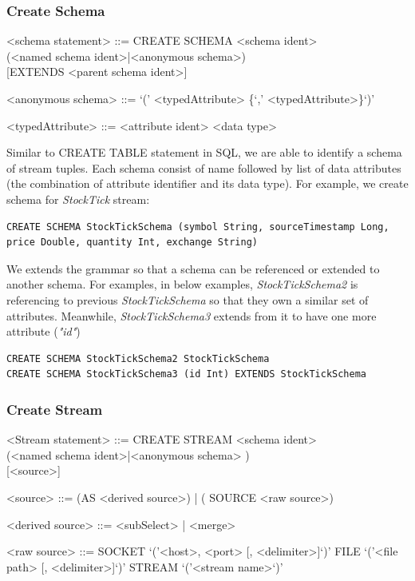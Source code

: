 \subsubsection{Create Schema}

\setlength{\grammarindent}{12em} %

\begin{grammar}

<schema statement> ::= CREATE SCHEMA <schema ident> \\
(<named schema ident>|<anonymous schema>) \\
  { }[EXTENDS <parent schema ident>]

<anonymous schema> ::= `(' <typedAttribute> \{`,' <typedAttribute>\}`)'

<typedAttribute> ::= <attribute ident> <data type>

\end{grammar}
	
Similar to CREATE TABLE statement in SQL, we are able to identify a schema of stream tuples. Each schema consist of name followed by list of data attributes (the combination of attribute identifier and its data type). For example, we create schema for \textit{StockTick} stream:
\begin{verbatim}
CREATE SCHEMA StockTickSchema (symbol String, sourceTimestamp Long, 
price Double, quantity Int, exchange String)
\end{verbatim}

We extends the grammar so that a schema can be referenced or extended to another schema. For examples, in below examples, \textit{StockTickSchema2} is referencing to previous \textit{StockTickSchema} so that they own a similar set of attributes. Meanwhile, \textit{StockTickSchema3} extends from it to have one more attribute (\textit{"id"})
\begin{verbatim}
CREATE SCHEMA StockTickSchema2 StockTickSchema
CREATE SCHEMA StockTickSchema3 (id Int) EXTENDS StockTickSchema
\end{verbatim}

\subsubsection{Create Stream} \label{query:createStream}
	
					
\begin{grammar}
<Stream statement> ::= CREATE STREAM <schema ident> \\		(<named schema ident>|<anonymous schema> ) \\
{ }[<source>]

<source> ::= (AS <derived source>) | ( SOURCE <raw source>)

<derived source> ::=   <subSelect> | <merge>

<raw source> ::= 
				SOCKET `('<host>, <port> [, <delimiter>]`)'
					\alt FILE `('<file path> [, <delimiter>]`)'
					\alt STREAM `('<stream name>`)'
\end{grammar}

